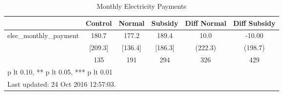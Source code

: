 \begin{table}[htbp]\centering
\def\sym#1{\ifmmode^{#1}\else\(^{#1}\)\fi}
\caption{Monthly Electricity Payments \label{tab:"balance"}}
\begin{tabular*}{0.9\hsize}{@{\hskip\tabcolsep\extracolsep\fill}l*{1}{ccccc}}
\toprule
                                &  Control&   Normal&  Subsidy&Diff Normal         &Diff Subsidy         \\
\midrule
elec\_monthly\_payment            &    180.7&    177.2&    189.4&     10.0         &   -10.00         \\
                                &  [209.3]&  [136.4]&  [186.3]&  (222.3)         &  (198.7)         \\
                                &      135&      191&      294&      326         &      429         \\
\bottomrule
\multicolumn{6}{l}{\footnotesize * p lt 0.10, ** p lt 0.05, *** p lt 0.01}\\
\multicolumn{6}{l}{\footnotesize Last updated: 24 Oct 2016 12:57:03.}\\
\end{tabular*}
\end{table}
